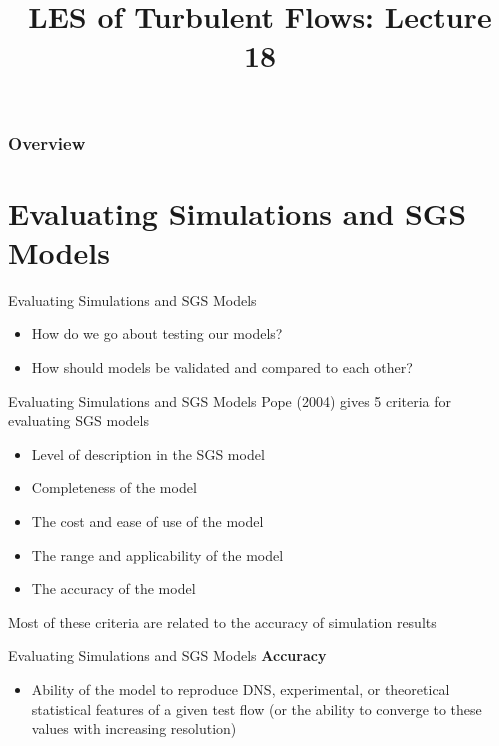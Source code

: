  
\title{LES of Turbulent Flows: Lecture 18}



\begin{frame} 
  \titlepage
\end{frame}


\begin{frame}
\frametitle{Overview}
\tableofcontents
\end{frame}

\section{Evaluating Simulations and SGS Models} %
\begin{frame}{Evaluating Simulations and SGS Models}
\begin{itemize}
	\item How do we go about testing our models?
	\item How should models be validated and compared to each other?
\end{itemize}
\end{frame}
\begin{frame}{Evaluating Simulations and SGS Models}
Pope (2004) gives 5 criteria for evaluating SGS models
\begin{itemize}
	\item Level of description in the SGS model
	\item Completeness of the model
	\item The cost and ease of use of the model
	\item The range and applicability of the model
	\item The accuracy of the model
\end{itemize}
Most of these criteria are related to the accuracy of simulation results
\end{frame}
\begin{frame}{Evaluating Simulations and SGS Models}
\textbf{Accuracy}
\begin{itemize}
	\item Ability of the model to reproduce DNS, experimental, or theoretical statistical features of a given test flow (or the ability to converge to these values with increasing resolution)
\end{itemize}
\end{frame}
